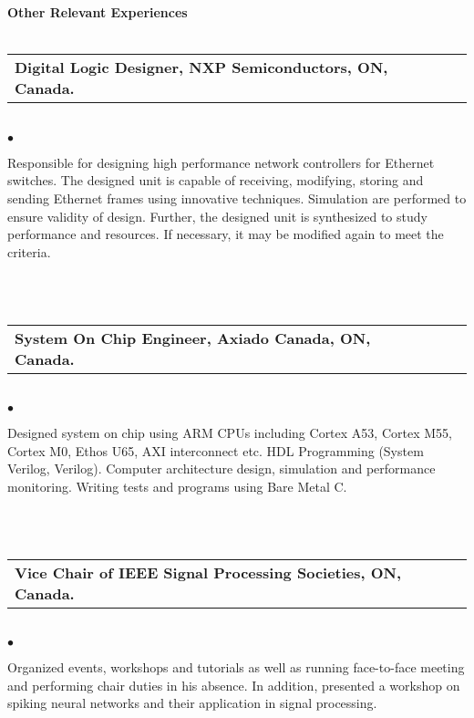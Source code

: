{\bf  Other Relevant Experiences  }\hrulefill \\ \\ \mdseries \normalsize
\begin{tabular}{L{12cm}p{3cm}r}\bf  {Digital Logic Designer, NXP Semiconductors, ON, Canada.}&&\mdseries {} \end{tabular}\normalsize \mdseries\\
 \phantom \quad $\bullet$ \begin{minipage}[t]{0.965\textwidth} 
 Responsible for designing high performance network controllers for Ethernet switches. The designed unit is capable of receiving, modifying, storing and sending Ethernet frames using innovative techniques. Simulation are performed to ensure validity  of design. Further, the designed unit is synthesized to study performance and resources. If necessary, it may be modified again to meet the criteria.  
 \end{minipage}  
 \mdseries\\  \\
\begin{tabular}{L{12cm}p{3cm}r}\bf  { System On Chip Engineer, Axiado Canada, ON, Canada.}&&\mdseries {} \end{tabular}\normalsize \mdseries\\
 \phantom \quad $\bullet$ \begin{minipage}[t]{0.965\textwidth} 
Designed system on chip using ARM CPUs including Cortex A53, Cortex M55, Cortex M0, Ethos U65, AXI interconnect etc. HDL Programming (System Verilog, Verilog). Computer architecture design, simulation  and performance monitoring.  Writing tests and programs using Bare Metal C. \end{minipage}  
 \mdseries\\  \\
 \begin{tabular}{L{12cm}p{3cm}r}\bf  { Vice Chair of IEEE Signal Processing Societies, ON, Canada.}&&\mdseries {} \end{tabular}\normalsize \mdseries\\
 \phantom \quad $\bullet$ \begin{minipage}[t]{0.965\textwidth} 
Organized events, workshops and tutorials  as well as running  face-to-face meeting and performing chair duties in his absence.
In addition, presented a workshop on spiking neural networks and their application in signal processing. \end{minipage}  
 \mdseries\\  \\
